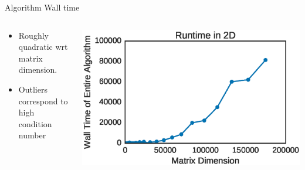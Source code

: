 \documentclass[10pt]{beamer}
\begin{document}
{{{{{{{{{{{{{\begin{frame}{Algorithm Wall time}
	\begin{columns}[c] %
		\begin{column}{.4\textwidth}
			\begin{itemize}
				\item {Roughly quadratic wrt matrix dimension.}
				\item {Outliers correspond to high condition number}
			\end{itemize}				
		\end{column}
		\hfill
		\begin{column}{0.6\textwidth}
		    \includegraphics[width=\linewidth]{../images/overallruntime.eps}
		\end{column}	
	\end{columns}
\end{frame}


}}}}}}}}}}}}}
\end{document}
